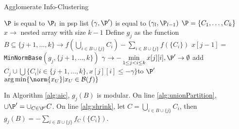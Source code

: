 \begin{algorithm}
\caption{Agglomerate Info-Clustering}\label{alg:aic}
	\begin{algorithmic}[1]
		\REQUIRE $\P$ is equal to $\P_l$ in psp list
		\ENSURE $(\gamma, \P')$ is equal to $(\gamma_l, \P_{l-1})$
		\STATE $\P = \{C_1, \dots, C_k\}$
		\STATE $x \to $ nested array with size $k-1$
			\STATE\label{alg:shrink} Define $g_j$ as the function $B \subseteq \{j+1, \dots, k\} \to 
			f(\bigcup_{i \in B\cup\{j\}}C_i)-\sum_{i\in B\cup\{j\}} f (\{C_i\})$
			\STATE $x[j-1] = $\texttt{MinNormBase}$(g_j, \{j+1, \dots, k\})$
		\ENDFOR
		\STATE $\gamma \to - \displaystyle\min_{1 \leq j<i\leq k} x[j][i], \P' \to \emptyset$
			 \label{alg:unionPartition}
			\STATE add $C_j \cup \bigcup\{C_i | i\in\{j+1, \dots, k\}, x[j][i]\leq -\gamma\}$to $\P'$
			\ENDIF
		\ENDFOR
		\RETURN $\arg\min \{\norm{x_U} | x_U \in \mathcal{B}(f)\}$
		\ENDFUNCTION
	\end{algorithmic}
\end{algorithm}
In Algorithm \ref{alg:aic}, $g_j(B)$ is modular. On line \ref{alg:unionPartition}, $\cup\P'=\cup_{C\in \P'} C$. On line \ref{alg:shrink}, let $C = \bigcup_{i \in B\cup\{j\}}C_i$, then
$g_j(B) = -\sum_{i \in B\cup\{j\}} f_C(\{C_i\})$.